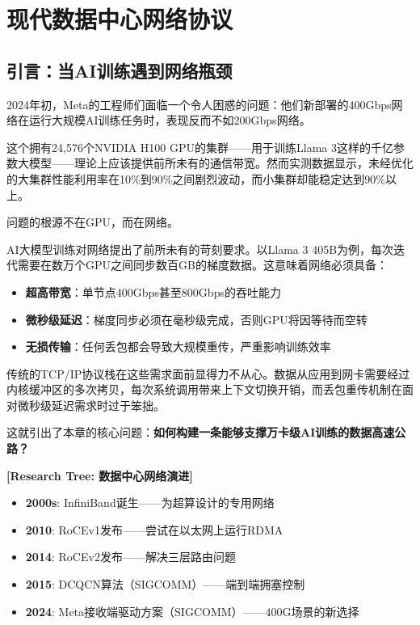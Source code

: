 
\section{现代数据中心网络协议}

\subsection{引言：当AI训练遇到网络瓶颈}

2024年初，Meta的工程师们面临一个令人困惑的问题：他们新部署的400Gbps网络在运行大规模AI训练任务时，表现反而不如200Gbps网络。

这个拥有24,576个NVIDIA H100 GPU的集群——用于训练Llama 3这样的千亿参数大模型——理论上应该提供前所未有的通信带宽。然而实测数据显示，未经优化的大集群性能利用率在10\%到90\%之间剧烈波动，而小集群却能稳定达到90\%以上。

问题的根源不在GPU，而在网络。

AI大模型训练对网络提出了前所未有的苛刻要求。以Llama 3 405B为例，每次迭代需要在数万个GPU之间同步数百GB的梯度数据。这意味着网络必须具备：

\begin{itemize}
    \item \textbf{超高带宽}：单节点400Gbps甚至800Gbps的吞吐能力
    \item \textbf{微秒级延迟}：梯度同步必须在毫秒级完成，否则GPU将因等待而空转
    \item \textbf{无损传输}：任何丢包都会导致大规模重传，严重影响训练效率
\end{itemize}

传统的TCP/IP协议栈在这些需求面前显得力不从心。数据从应用到网卡需要经过内核缓冲区的多次拷贝，每次系统调用带来上下文切换开销，而丢包重传机制在面对微秒级延迟需求时过于笨拙。

这就引出了本章的核心问题：\textbf{如何构建一条能够支撑万卡级AI训练的数据高速公路？}

\textbf{[Research Tree: 数据中心网络演进]}
\begin{itemize}
    \item \textbf{2000s}: InfiniBand诞生——为超算设计的专用网络
    \item \textbf{2010}: RoCEv1发布——尝试在以太网上运行RDMA
    \item \textbf{2014}: RoCEv2发布——解决三层路由问题
    \item \textbf{2015}: DCQCN算法（SIGCOMM）——端到端拥塞控制
    \item \textbf{2024}: Meta接收端驱动方案（SIGCOMM）——400G场景的新选择
\end{itemize}

